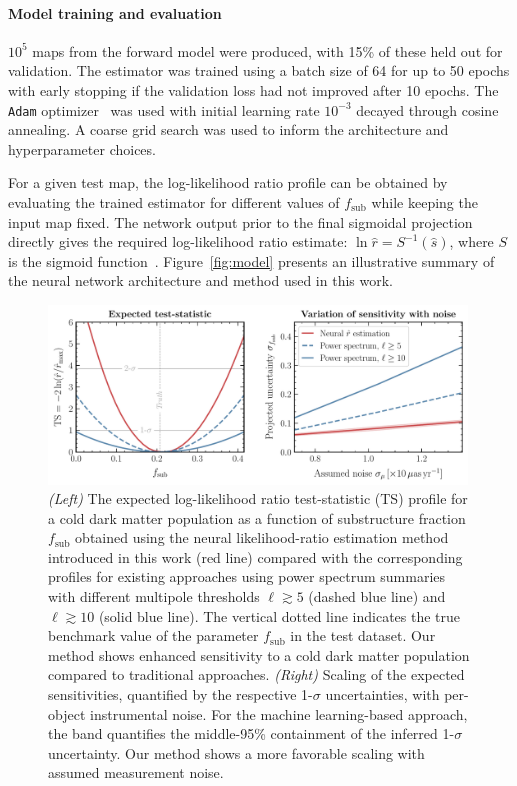 \documentclass[preprint]{article}
\begin{document}
\paragraph{Model training and evaluation} $10^5$ maps from the forward model were produced, with 15\% of these held out for validation. The estimator was trained using a batch size of 64 for up to 50 epochs with early stopping if the validation loss had not improved after 10 epochs. The \texttt{Adam} optimizer~\cite{kingma2017adam} was used with initial learning rate $10^{-3}$ decayed through cosine annealing. A coarse grid search was used to inform the architecture and hyperparameter choices. 

For a given test map, the log-likelihood ratio profile can be obtained by evaluating the trained estimator for different values of $f_\mathrm{sub}$ while keeping the input map fixed. The network output prior to the final sigmoidal projection directly gives the required log-likelihood ratio estimate: $\ln\hat r = S^{-1}(\hat s)$, where $S$ is the sigmoid function~\cite{Hermans:2019ioj,Hermans:2020skz}.
Figure~\ref{fig:model} presents an illustrative summary of the neural network architecture and method used in this work.

\begin{figure}[!htbp]
\centering
\includegraphics[width=0.99\textwidth]{figures/results}
\caption{\emph{(Left)} The expected log-likelihood ratio test-statistic (TS) profile for a cold dark matter population as a function of substructure fraction $f_\mathrm{sub}$ obtained using the neural likelihood-ratio estimation method introduced in this work (red line) compared with the corresponding profiles for existing approaches using power spectrum summaries with different multipole thresholds $\ell \gtrsim 5$ (dashed blue line) and $\ell \gtrsim 10$ (solid blue line). The vertical dotted line indicates the true benchmark value of the parameter $f_\mathrm{sub}$ in the test dataset. Our method shows enhanced sensitivity to a cold dark matter population compared to traditional approaches. \emph{(Right)} Scaling of the expected sensitivities, quantified by the respective 1-$\sigma$ uncertainties, with per-object instrumental noise. For the machine learning-based approach, the band quantifies the middle-95\% containment of the inferred 1-$\sigma$ uncertainty. Our method shows a more favorable scaling with assumed measurement noise.}
\label{fig:experiment}
\end{figure}
\end{document}
